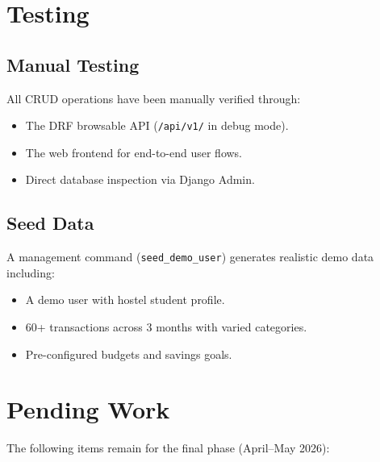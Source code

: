 \documentclass[12pt,a4paper]{article}
\begin{document}
\section{Testing}

\subsection{Manual Testing}
All CRUD operations have been manually verified through:
\begin{itemize}
  \item The DRF browsable API (\texttt{/api/v1/} in debug mode).
  \item The web frontend for end-to-end user flows.
  \item Direct database inspection via Django Admin.
\end{itemize}

\subsection{Seed Data}
A management command (\texttt{seed\_demo\_user}) generates realistic demo data including:
\begin{itemize}
  \item A demo user with hostel student profile.
  \item 60+ transactions across 3 months with varied categories.
  \item Pre-configured budgets and savings goals.
\end{itemize}

\section{Pending Work}

The following items remain for the final phase (April--May 2026):
\end{document}
